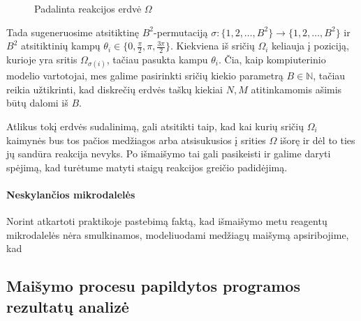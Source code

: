 \begin{figure}[!h]
\centering
\caption{Padalinta reakcijos erdvė $\Omega$}
\label{mix-inequality-graphic}

\end{figure}

Tada sugeneruosime atsitiktinę $B^2$-permutaciją $\sigma: \{ 1, 2, \dots, B^2 \} \to \{ 1, 2, \dots, B^2 \} $ ir $B^2$ atsitiktinių kampų $\theta_i \in \{0, \frac{\pi}{2}, \pi, \frac{3\pi}{2}\}$. Kiekviena iš sričių $\Omega_i$ keliauja į poziciją, kurioje yra sritis $\Omega_{\sigma(i)}$, tačiau pasukta kampu $\theta_i$. Čia, kaip kompiuterinio modelio vartotojai, mes galime pasirinkti sričių kiekio parametrą $B\in\mathbb{N}$, tačiau reikia užtikrinti, kad diskrečių erdvės taškų kiekiai $N, M$ atitinkamomis ašimis būtų dalomi iš $B$. 

Atlikus tokį erdvės sudalinimą, gali atsitikti taip, kad kai kurių sričių $\Omega_i$ kaimynės bus tos pačios medžiagos arba atsisukusios į srities $\Omega$ išorę ir dėl to ties jų sandūra reakcija nevyks. Po išmaišymo tai gali pasikeisti ir galime daryti spėjimą, kad turėtume matyti staigų reakcijos greičio padidėjimą. 

\paragraph{Neskylančios mikrodalelės}

Norint atkartoti praktikoje pastebimą faktą, kad išmaišymo metu reagentų mikrodalelės nėra smulkinamos, modeliuodami medžiagų maišymą apsiribojime, kad 




\subsection{Maišymo procesu papildytos programos rezultatų analizė}

